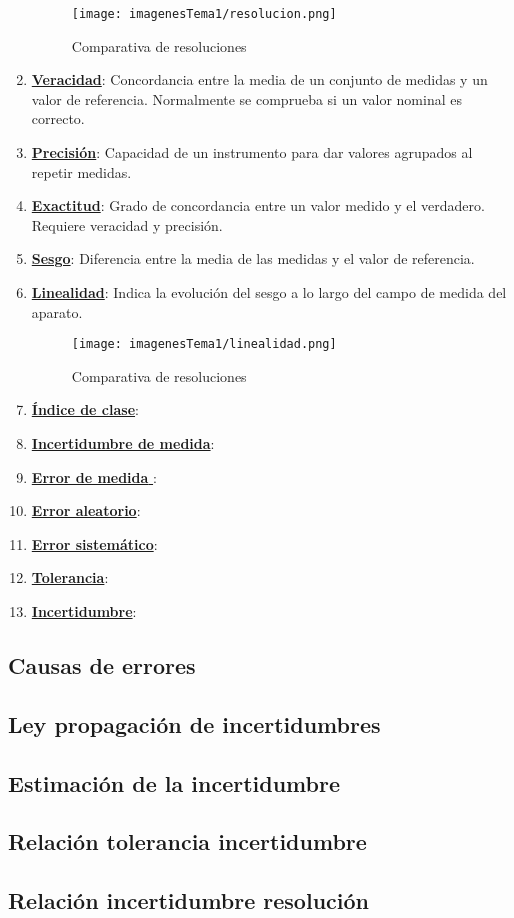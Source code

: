 \begin{enumerate}
	\begin{figure}[H]
		\centering
		\texttt{[image: imagenesTema1/resolucion.png]}  
		\caption{Comparativa de resoluciones}
		\label{fig:sample}
	\end{figure}
	
	
	\item \underline{\textbf{Veracidad}}: Concordancia entre la media de un conjunto de medidas y un valor de referencia. Normalmente se comprueba si un valor nominal es correcto.
	\item \underline{\textbf{Precisión}}: Capacidad de un instrumento para dar valores agrupados al repetir medidas.
	\item \underline{\textbf{Exactitud}}: Grado de concordancia entre un valor medido y el verdadero. Requiere veracidad y precisión.
	\item \underline{\textbf{Sesgo}}: Diferencia entre la media de las medidas y el valor de referencia.
	\item \underline{\textbf{Linealidad}}: Indica la evolución del sesgo a lo largo del campo de medida del aparato.
	
	\begin{figure}[H]
		\centering
		\texttt{[image: imagenesTema1/linealidad.png]}  
		\caption{Comparativa de resoluciones}
		\label{fig:sample}
	\end{figure}
	
	\item \underline{\textbf{Índice de clase}}:
	\item \underline{\textbf{Incertidumbre de medida}}:
	\item \underline{\textbf{Error de medida }}:
	\item \underline{\textbf{Error aleatorio}}:
	\item \underline{\textbf{Error sistemático}}:
	\item \underline{\textbf{Tolerancia}}:
	\item \underline{\textbf{Incertidumbre}}:
\end{enumerate}
\subsection{Causas de errores}
\subsection{Ley propagación de incertidumbres}
\subsection{Estimación de la incertidumbre}
\subsection{Relación tolerancia incertidumbre}
\subsection{Relación incertidumbre resolución}

